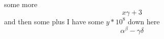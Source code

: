 some more $$x \gamma + 3$$ and then some %
plus I have some $y*10^{8}$ down here
$$ %
\alpha^{\beta} -\gamma \delta
$$ %
